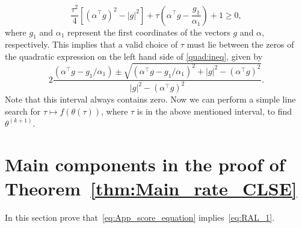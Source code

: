\begin{equation}\label{quad:ineq}
\frac{\tau^2}{4}[(\alpha^{\top}g)^2 - |g|^2] + \tau \left(\alpha^{\top}g - \frac{g_1}{\alpha_1}\right) + 1 \ge 0,
\end{equation}
where $g_1$ and $\alpha_1$ represent the first coordinates of the vectors $g$ and $\alpha$, respectively. This implies that a valid choice of $\tau$ must lie between the zeros of the quadratic expression on the left hand side of \eqref{quad:ineq}, given by
\[
2\frac{\left(\alpha^{\top}g - g_1/\alpha_1\right)\pm\sqrt{\left(\alpha^{\top}g - g_1/\alpha_1\right)^2 + |g|^2 - (\alpha^{\top}g)^2}}{|g|^2-(\alpha^{\top}g)^2}.
\]
Note that this interval always contains zero.  Now we can perform a simple line search for $\tau\mapsto f(\theta(\tau))$, where $\tau$ is in the above mentioned interval, to find $\theta^{(k+1)}$.  \fi  {} \fi 



\section{Main components in the proof of Theorem~\ref{thm:Main_rate_CLSE}} %
\label{app:sketchCLSE}
  In this section prove that~\eqref{eq:App_score_equation} implies~\eqref{eq:RAL_1}.


